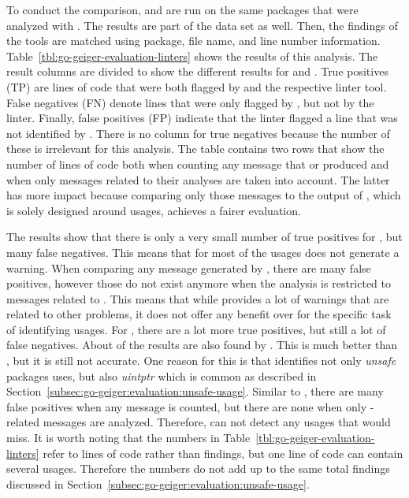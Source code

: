 To conduct the comparison, \toolVet{} and \toolGosec{} are run on the same \packagesAnalyzed{} packages that were
analyzed with \toolGeiger{}.
The results are part of the data set as well.
Then, the findings of the tools are matched using package, file name, and line number information.
Table~\ref{tbl:go-geiger-evaluation-linters} shows the results of this analysis.
The result columns are divided to show the different results for \toolVet{} and \toolGosec{}.
True positives (TP) are lines of code that were both flagged by \toolGeiger{} and the respective linter tool.
False negatives (FN) denote lines that were only flagged by \toolGeiger{}, but not by the linter.
Finally, false positives (FP) indicate that the linter flagged a line that was not identified by \toolGeiger{}.
There is no column for true negatives because the number of these is irrelevant for this analysis.
The table contains two rows that show the number of lines of code both when counting any message that \toolVet{} or
\toolGosec{} produced and when only messages related to their \unsafe{} analyses are taken into account.
The latter has more impact because comparing only those messages to the output of \toolGeiger{}, which is solely
designed around \unsafe{} usages, achieves a fairer evaluation.



The results show that there is only a very small number of true positives for \toolVet{}, but many false negatives.
This means that for most of the \unsafe{} usages \toolVet{} does not generate a warning.
When comparing any message generated by \toolVet{}, there are many false positives, however those do not exist anymore
when the analysis is restricted to \toolVet{} messages related to \unsafe{}.
This means that while \toolVet{} provides a lot of warnings that are related to other problems, it does not offer any
benefit over \toolGeiger{} for the specific task of identifying \unsafe{} usages.
For \toolGosec{}, there are a lot more true positives, but still a lot of false negatives.
About  of the \toolGeiger{} results are also found by \toolGosec{}.
This is much better than \toolVet{}, but it is still not accurate.
One reason for this is that \toolGeiger{} identifies not only \textit{unsafe} packages uses, but also \textit{uintptr}
which is common as described in Section~\ref{subsec:go-geiger:evaluation:unsafe-usage}.
Similar to \toolVet{}, there are many false positives when any \toolGosec{} message is counted, but there are none when
only \unsafe{}-related messages are analyzed.
Therefore, \toolGosec{} can not detect any usages that \toolGeiger{} would miss.
It is worth noting that the numbers in Table~\ref{tbl:go-geiger-evaluation-linters} refer to lines of code rather than
\unsafe{} findings, but one line of code can contain several \unsafe{} usages.
Therefore the numbers do not add up to the same total findings discussed in
Section~\ref{subsec:go-geiger:evaluation:unsafe-usage}.

